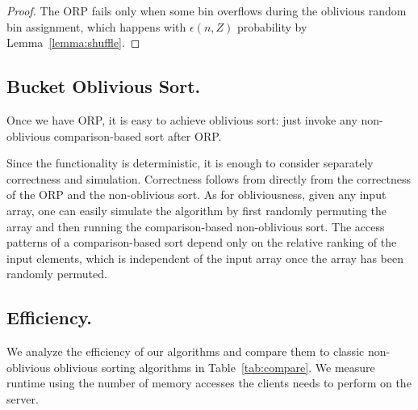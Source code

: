\begin{proof}
The ORP fails only when some bin overflows during the oblivious random bin assignment, which happens with $\epsilon(n,Z)$ probability by Lemma~\ref{lemma:shuffle}.
\end{proof}

\subsection{Bucket Oblivious Sort.}
\label{sec:osort}
Once we have ORP, it is easy to achieve oblivious sort: just invoke any non-oblivious comparison-based sort after ORP.

Since the functionality is deterministic, it is enough to consider separately correctness and simulation. Correctness follows from directly from the correctness of the ORP and the non-oblivious sort. As for obliviousness, given any input array, one can easily simulate the algorithm by first randomly permuting the array and then running the comparison-based non-oblivious sort. 
The access patterns of a comparison-based sort depend only on the relative ranking of the input elements, which is independent of the input array once the array has been randomly permuted. 

\subsection{Efficiency.}
\label{sec:efficiency}

We analyze the efficiency of our algorithms and compare them to classic non-oblivious oblivious sorting algorithms in Table~\ref{tab:compare}.
We measure runtime using the number of memory accesses the clients needs to perform on the server.






